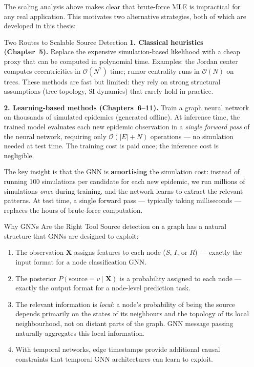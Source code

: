 The scaling analysis above makes clear that brute-force MLE is impractical
for any real application. This motivates two alternative strategies, both
of which are developed in this thesis:

\begin{conceptbox}{Two Routes to Scalable Source Detection}
\textbf{1. Classical heuristics (Chapter~5).} Replace the expensive
simulation-based likelihood with a cheap proxy that can be computed in
polynomial time. Examples: the Jordan center computes eccentricities in
$\mathcal{O}(N^2)$ time; rumor centrality runs in $\mathcal{O}(N)$ on trees.
These methods are fast but limited: they rely on strong structural
assumptions (tree topology, SI dynamics) that rarely hold in practice.

\textbf{2. Learning-based methods (Chapters~6--11).} Train a graph neural
network on thousands of simulated epidemics (generated offline). At
inference time, the trained model evaluates each new epidemic observation
in a \emph{single forward pass} of the neural network, requiring only
$\mathcal{O}(|E| + N)$ operations — no simulation needed at test time.
The training cost is paid once; the inference cost is negligible.
\end{conceptbox}

The key insight is that the GNN is \textbf{amortising} the simulation cost:
instead of running 100 simulations per candidate for each new epidemic, we
run millions of simulations \emph{once} during training, and the network
learns to extract the relevant patterns. At test time, a single forward pass
— typically taking milliseconds — replaces the hours of brute-force computation.

\begin{keyinsight}{Why GNNs Are the Right Tool}
Source detection on a graph has a natural structure that GNNs are designed
to exploit:
\begin{enumerate}
    \item The observation $\mathbf{X}$ assigns features to each node
    ($S$, $I$, or $R$) — exactly the input format for a node classification
    GNN.
    \item The posterior $P(\text{source}=v \mid \mathbf{X})$ is a
    probability assigned to each node — exactly the output format for a
    node-level prediction task.
    \item The relevant information is \emph{local}: a node's probability of
    being the source depends primarily on the states of its neighbours and
    the topology of its local neighbourhood, not on distant parts of the
    graph. GNN message passing naturally aggregates this local information.
    \item With temporal networks, edge timestamps provide additional causal
    constraints that temporal GNN architectures can learn to exploit.
\end{enumerate}
\end{keyinsight}

